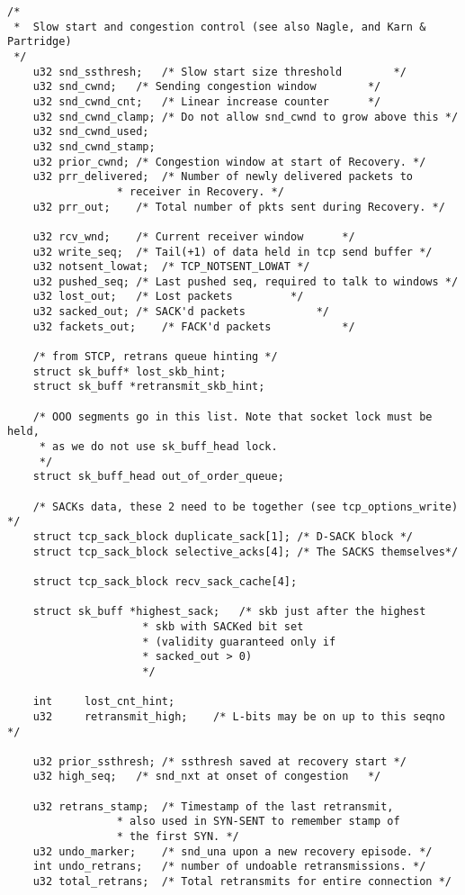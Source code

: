 \begin{verbatim}
/*
 *  Slow start and congestion control (see also Nagle, and Karn & Partridge)
 */
    u32 snd_ssthresh;   /* Slow start size threshold        */
    u32 snd_cwnd;   /* Sending congestion window        */
    u32 snd_cwnd_cnt;   /* Linear increase counter      */
    u32 snd_cwnd_clamp; /* Do not allow snd_cwnd to grow above this */
    u32 snd_cwnd_used;
    u32 snd_cwnd_stamp;
    u32 prior_cwnd; /* Congestion window at start of Recovery. */
    u32 prr_delivered;  /* Number of newly delivered packets to
                 * receiver in Recovery. */
    u32 prr_out;    /* Total number of pkts sent during Recovery. */

    u32 rcv_wnd;    /* Current receiver window      */
    u32 write_seq;  /* Tail(+1) of data held in tcp send buffer */
    u32 notsent_lowat;  /* TCP_NOTSENT_LOWAT */
    u32 pushed_seq; /* Last pushed seq, required to talk to windows */
    u32 lost_out;   /* Lost packets         */
    u32 sacked_out; /* SACK'd packets           */
    u32 fackets_out;    /* FACK'd packets           */

    /* from STCP, retrans queue hinting */
    struct sk_buff* lost_skb_hint;
    struct sk_buff *retransmit_skb_hint;

    /* OOO segments go in this list. Note that socket lock must be held,
     * as we do not use sk_buff_head lock.
     */
    struct sk_buff_head out_of_order_queue;

    /* SACKs data, these 2 need to be together (see tcp_options_write) */
    struct tcp_sack_block duplicate_sack[1]; /* D-SACK block */
    struct tcp_sack_block selective_acks[4]; /* The SACKS themselves*/

    struct tcp_sack_block recv_sack_cache[4];

    struct sk_buff *highest_sack;   /* skb just after the highest
                     * skb with SACKed bit set
                     * (validity guaranteed only if
                     * sacked_out > 0)
                     */

    int     lost_cnt_hint;
    u32     retransmit_high;    /* L-bits may be on up to this seqno */

    u32 prior_ssthresh; /* ssthresh saved at recovery start */
    u32 high_seq;   /* snd_nxt at onset of congestion   */

    u32 retrans_stamp;  /* Timestamp of the last retransmit,
                 * also used in SYN-SENT to remember stamp of
                 * the first SYN. */
    u32 undo_marker;    /* snd_una upon a new recovery episode. */
    int undo_retrans;   /* number of undoable retransmissions. */
    u32 total_retrans;  /* Total retransmits for entire connection */


\end{verbatim}
